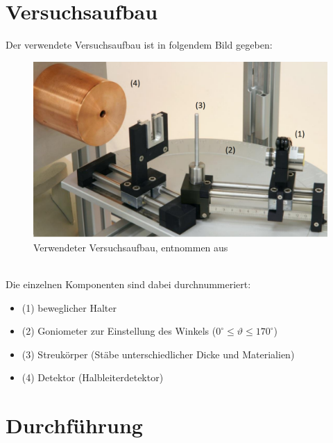 \documentclass[german,  %
parskip=full,  %
]{scrartcl}
\begin{document}
\section{Versuchsaufbau}
Der verwendete Versuchsaufbau ist in folgendem Bild gegeben:
\begin{figure}[h!]\centering
\includegraphics[scale=0.4]{aufbau}
\caption{Verwendeter Versuchsaufbau, entnommen aus \cite{Anleitung}}
\end{figure}
\\
Die einzelnen Komponenten sind dabei durchnummeriert:
\begin{itemize}
\item (1) beweglicher Halter 
\item (2) Goniometer zur Einstellung des Winkels ($0^{\circ} \leq \vartheta \leq 170^{\circ}$)
\item (3) Streukörper (Stäbe unterschiedlicher Dicke und Materialien)
\item (4) Detektor (Halbleiterdetektor)
\end{itemize}

\section{Durchführung}
\end{document}
